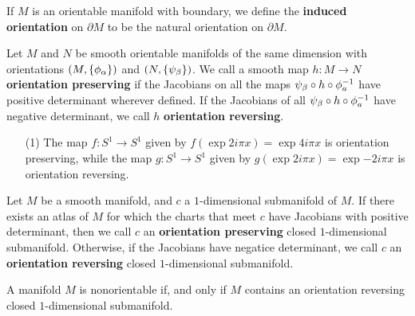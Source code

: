 \begin{definition}
    If $M$ is an orientable manifold with boundary, we define the
    \textbf{induced orientation} on $\partial{M}$ to be the natural orientation
    on $\partial{M}$.
\end{definition}

\begin{definition}
    Let $M$ and  $N$ be smooth orientable manifolds of the same dimension with
    orientations $(M,\{\phi_\alpha\})$ and $(N,\{\psi_\beta\})$. We call a smooth map
    $h:M \xrightarrow{} N$ \textbf{orientation preserving} if the Jacobians on
    all the maps $\psi_\beta \circ h \circ \phi_a^{-1}$ have positive determinant
    wherever defined. If the Jacobians of all $\psi_\beta \circ h \circ
    \phi_a^{-1}$ have negative determinant, we call $h$  \textbf{orientation
    reversing}.
\end{definition}

\begin{example}\label{example_1.10}
    \begin{enumerate}
        \item[(1)] The map $f:S^1 \xrightarrow{} S^1$ given by $f(\exp{2i\pi
            x})=\exp{4i\pi x}$ is orientation preserving, while the map $g:S^1
            \xrightarrow{} S^1$ given by $g(\exp{2i\pi x})=\exp{-2i\pi x}$ is
            orientation reversing.
    \end{enumerate}
\end{example}

\begin{definition}
    Let $M$ be a smooth manifold, and  $c$ a  $1$-dimensional submanifold of
    $M$. If there exists an atlas of  $M$ for which the charts that meet  $c$
    have Jacobians with positive determinant, then we call  $c$ an
    \textbf{orientation preserving} closed $1$-dimensional submanifold.
    Otherwise, if the Jacobians have negatice determinant, we call $c$ an
    \textbf{orientation reversing} closed $1$-dimensional submanifold.
\end{definition}

\begin{lemma}\label{1.3.1}
    A manifold $M$ is nonorientable if, and only if  $M$ contains an orientation
    reversing closed  $1$-dimensional submanifold.
\end{lemma}
